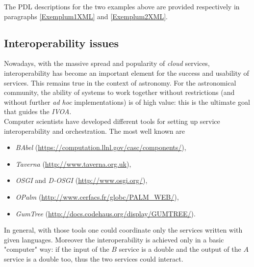 \documentclass[a4paper,11pt] {ivoa}
\begin{document}
 The PDL descriptions for the two examples above are provided respectively in paragraphs \ref{Exemplum1XML}
and \ref{Exemplum2XML}.

\subsection{Interoperability issues}\label{ParInteropIssues}
Nowadays, with the massive spread and popularity of {\it cloud} services, interoperability has become
an important element for the success and usability of services. This remains true in the context of
astronomy.
For the astronomical community, the ability of systems to work together without restrictions (and
without further {\it ad hoc} implementations) is of high value: this is the ultimate goal
that guides the {\it IVOA}.\\

Computer scientists have developed different tools for setting up service interoperability and
orchestration. The most well known are
\begin{itemize}
\item {\it BAbel} (\href{https://computation.llnl.gov/casc/components/}{https://computation.llnl.gov/casc/components/}),
\item {\it Taverna } (\href{http://www.taverna.org.uk}{http://www.taverna.org.uk}),
\item {\it OSGI} and {\it D-OSGI } (\href{http://www.osgi.org/}{http://www.osgi.org/}),
\item {\it OPalm} (\href{http://www.cerfacs.fr/globc/PALM_WEB/}{http://www.cerfacs.fr/globc/PALM\_WEB/}),
\item {\it GumTree} (\href{http://docs.codehaus.org/display/GUMTREE/}{http://docs.codehaus.org/display/GUMTREE/}).
\end{itemize}
In general, with those tools one could coordinate only the services written with given languages.
Moreover the interoperability is achieved only in a basic "computer" way: if the input of the $B$
service is a double and the output of the $A$ service is a double too, thus the two services could
interact.\\
\end{document}
